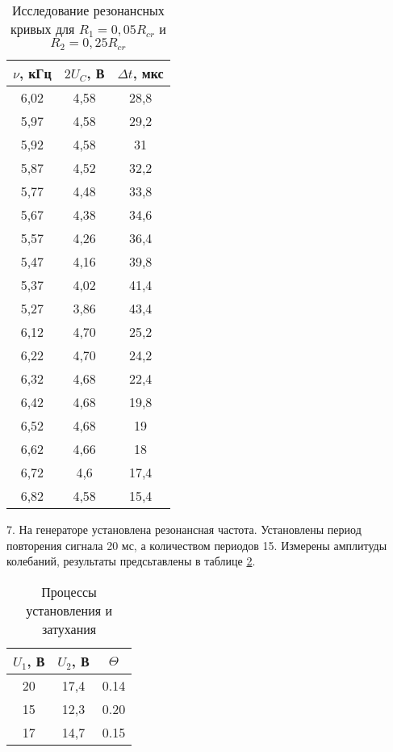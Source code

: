 \begin{table}[h]
    \begin{tabular}{|c|c|c|}
        \hline
        $\nu$, кГц & $2U_C$, В & $\Delta t$, мкс \\
        \hline
        6,02 & 4,58 & 28,8 \\
        \hline
        5,97 & 4,58 & 29,2 \\
        \hline
        5,92 & 4,58 & 31 \\
        \hline
        5,87 & 4,52 & 32,2 \\
        \hline
        5,77 & 4,48 & 33,8 \\
        \hline
        5,67 & 4,38 & 34,6 \\
        \hline
        5,57 & 4,26 & 36,4 \\
        \hline
        5,47 & 4,16 & 39,8 \\
        \hline
        5,37 & 4,02 & 41,4 \\
        \hline
        5,27 & 3,86 & 43,4 \\
        \hline
        6,12 & 4,70 & 25,2 \\
        \hline
        6,22 & 4,70 & 24,2 \\
        \hline
        6,32 & 4,68 & 22,4 \\
        \hline
        6,42 & 4,68 & 19,8 \\
        \hline
        6,52 & 4,68 & 19 \\
        \hline
        6,62 & 4,66 & 18 \\
        \hline
        6,72 & 4,6 & 17,4 \\
        \hline
        6,82 & 4,58 & 15,4 \\
        \hline
    \end{tabular}
    \caption{Исследование резонансных кривых для $R_1 = 0,05R_{cr}$ и $R_2 = 0,25R_{cr}$}
    \label{tab:4}
\end{table}

7. На генераторе установлена резонансная частота. Установлены период повторения сигнала 20 мс, а количеством периодов 15.
Измерены амплитуды колебаний, результаты предсьтавлены в таблице \ref{tab:5}.
\begin{table}[h]
    \centering
    \begin{tabular}{|c|c|c|}
        \hline
        $U_1$, В & $U_2$, В & $\Theta$ \\
        \hline
        20 & 17,4 & 0.14\\
        \hline
        15 & 12,3 & 0.20\\
        \hline
        17 & 14,7 & 0.15\\
        \hline
    \end{tabular}
    \caption{Процессы установления и затухания}
    \label{tab:5}
\end{table}

